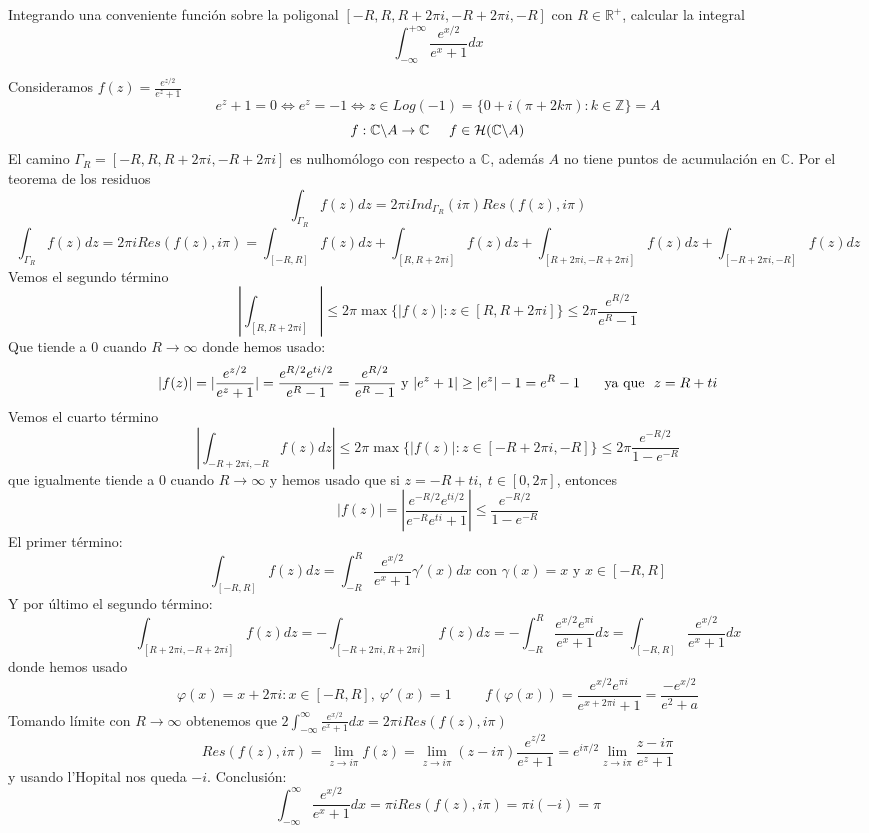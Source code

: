 \begin{ejer}
	Integrando una conveniente función sobre la poligonal $[-R,R,R+2\pi i,-R+2\pi i,-R]$ con $R\in\mathbb{R}^+$, calcular la integral
	$$ \int_{-\infty}^{+\infty} \frac{e^{x/2}}{e^x+1}dx $$
\end{ejer}
\begin{sol}
	
	Consideramos 
	$f(z) = \frac{e^{z/2}}{e^z+1}$
	$$e^z+1=0 \Longleftrightarrow e^z = -1 \Longleftrightarrow z\in Log(-1) = \{ 0+i(\pi+2k\pi) : k\in\mathbb{Z} \} = A$$
	$$f : \mathbb{C}\backslash A \rightarrow \mathbb{C}\hspace{0.5cm} f\in\mathcal{H}(\mathbb{C}\backslash A)$$
	El camino $\Gamma_R  = [-R,R,R+2\pi i, -R+2\pi i]$ es nulhomólogo con respecto a $\mathbb{C}$, además $A$ no tiene puntos de acumulación en $\mathbb{C}$.
	Por el teorema de los residuos
	$$\int_{\Gamma_R} f(z)dz = 2\pi i Ind_{\Gamma_R}(i\pi) Res(f(z),i\pi)$$
	$$\int_{\Gamma_R} f(z)dz = 2\pi i Res(f(z),i\pi) = \int_{[-R,R]} f(z)dz + \int_{[R,R+2\pi i]} f(z)dz + \int_{[R+2\pi i, -R+2\pi i]} f(z)dz + \int_{[-R+2\pi i, -R]} f(z)dz$$
	Vemos el segundo término
	$$\left| \int_{[R,R+2\pi i]} \right| \leq 2\pi\max\{ |f(z)| : z\in [R,R+2\pi i] \} \leq 2\pi \frac{e^{R/2}}{e^R-1} $$
	Que tiende a $0$ cuando $R\rightarrow \infty$
	donde hemos usado:
	$$|f(z)| = |\frac{e^{z/2}}{e^z+1}| = \frac{e^{R/2} e^{ti/2}}{e^R-1} = \frac{e^{R/2}}{e^R-1} \text{ y } |e^z+1| \geq |e^z|-1 = e^R-1 \hspace{0.5cm}\text{ ya que \ }z=R+ti$$
	Vemos el cuarto término
	$$\left| \int_{-R+2\pi i, -R} f(z)dz \right| \leq 2\pi \max \{ |f(z)| : z\in[-R+2\pi i, -R] \} \leq 2\pi \frac{e^{-R/2}}{1-e^{-R}} $$ que igualmente tiende a $0$ cuando $R\rightarrow\infty$ y hemos usado que si $z= -R+ti, \ t\in[0,2\pi]$, entonces
	$$|f(z)| = \left| \frac{e^{-R/2}e^{ti/2}}{e^{-R}e^{ti}+1} \right| \leq \frac{e^{-R/2}}{1-e^{-R}}$$
	El primer término:
	$$\int_{[-R,R]} f(z)dz = \int_{-R}^{R} \frac{e^{x/2}}{e^x+1} \gamma'(x)dx \text{ con } \gamma(x)=x \text{ y }x\in[-R,R]$$
	Y por último el segundo término:
	$$\int_{[R+2\pi i, -R+2\pi i]} f(z)dz = -\int_{[-R+2\pi i, R+2\pi i]} f(z)dz = -\int_{-R}^{R} \frac{e^{x/2}e^{\pi i}}{e^x+1}dz = \int_{[-R,R]} \frac{e^{x/2}}{e^x+1}dx$$
	donde hemos usado
	$$\varphi (x) = x+2\pi i : x\in[-R,R], \ \varphi'(x) = 1 \hspace{1cm} f(\varphi(x)) = \frac{e^{x/2}e^{\pi i}}{e^{x+2\pi i}+1} = \frac{-e^{x/2}}{e^2+a}$$
	Tomando límite con $R\rightarrow\infty$ obtenemos que
	$2\int_{-\infty}^{\infty} \frac{e^{x/2}}{e^x+1} dx = 2\pi iRes(f(z),i\pi)$
	$$Res(f(z),i\pi) = \lim_{z\rightarrow i\pi} f(z) = \lim_{z\rightarrow i\pi} (z-i\pi) \frac{e^{z/2}}{e^z+1} = e^{i\pi/2} \lim_{z\rightarrow i\pi} \frac{z-i\pi}{e^z+1}$$
	y usando l'Hopital nos queda
	$-i$.
	Conclusión:
	$$\int_{-\infty}^{\infty} \frac{e^{x/2}}{e^x+1} dx = \pi iRes(f(z),i\pi) = \pi i(-i) = \pi $$
\end{sol}


\newpage